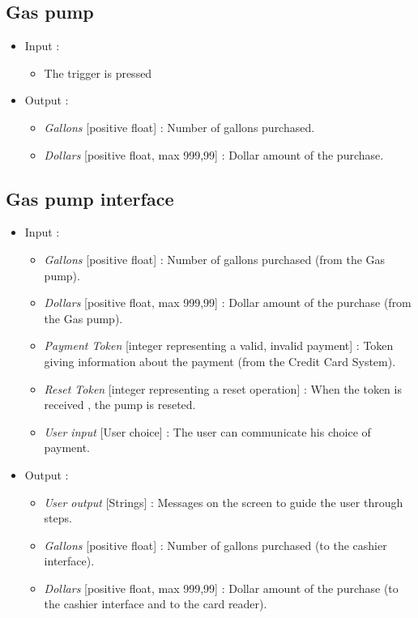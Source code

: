 \documentclass[11pt, a4paper]{article}
\newcommand{\data}[1]{\textit{#1}}
\begin{document}
\subsection{Gas pump}

\begin{itemize}
\item Input :
		\begin{itemize}
		\item The trigger is pressed
		\end{itemize}

\item Output :
		\begin{itemize}
		\item \data{Gallons} [positive float] : Number of gallons purchased. 
    \item \data{Dollars} [positive float, max 999,99] : Dollar amount of the purchase.
		\end{itemize}
\end{itemize}



\subsection{Gas pump interface}

\begin{itemize}
\item Input :
		\begin{itemize}
    \item \data{Gallons} [positive float] : Number of gallons purchased (from the Gas pump).
    \item \data{Dollars} [positive float, max 999,99] : Dollar amount of the purchase (from the Gas pump).
    \item \data{Payment Token} [integer representing a {valid, invalid} payment] : Token giving information about the payment (from the Credit Card System).
    \item \data{Reset Token} [integer representing a reset operation] : When the token is received , the pump is reseted.
    \item \data{User input} [User choice] : The user can communicate his choice of payment.
    \end{itemize}

\item Output :
		\begin{itemize}
		\item \data{User output} [Strings] : Messages on the screen to guide the user through steps.
    \item \data{Gallons} [positive float] : Number of gallons purchased (to the cashier interface).
    \item \data{Dollars} [positive float, max 999,99] : Dollar amount of the purchase (to the cashier interface and to the card reader).
		\end{itemize}
\end{itemize}
\end{document}
